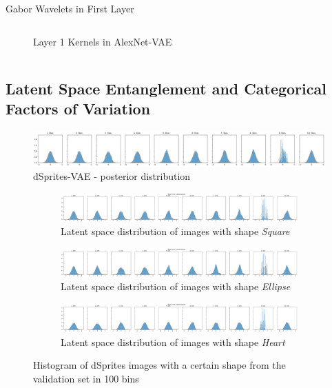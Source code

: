 \documentclass{beamer}
\begin{document}
\begin{frame}{Gabor Wavelets in First Layer}
\begin{columns}
\begin{column}{0.48\textwidth}
\begin{figure}
\caption{Layer 1 Kernels in AlexNet-VAE}
\end{figure}
\end{column}
\end{columns}
\end{frame}
\subsection{Latent Space Entanglement and Categorical Factors of Variation}
\begin{frame}
\begin{figure}
\centering
\includegraphics[width=\textwidth]{images/latent_space_entanglement/vae_dsprites_lf_10000_dist.png}
\caption[VAE Latent Space Distribution - dSprites]{dSprites-VAE - posterior distribution}
\end{figure}
\end{frame}
\begin{frame}
\begin{figure}
\centering
\begin{subfigure}{\textwidth}
\centering
\includegraphics[width=\textwidth]{images/latent_space_entanglement/vae_dsprites_lf_10000_dist_shape_1.png}
\caption{Latent space distribution of images with shape \textit{Square}}
\end{subfigure}
\begin{subfigure}{\textwidth}
\centering
\includegraphics[width=\textwidth]{images/latent_space_entanglement/vae_dsprites_lf_10000_dist_shape_2.png}
\caption{Latent space distribution of images with shape \textit{Ellipse}}
\end{subfigure}
\begin{subfigure}{\textwidth}
\centering
\includegraphics[width=\textwidth]{images/latent_space_entanglement/vae_dsprites_lf_10000_dist_shape_3.png}
\caption{Latent space distribution of images with shape \textit{Heart}}
\end{subfigure}
\caption[VAE Latent Space Distribution - dSprites Shapes]{Histogram of dSprites images with a certain shape from the validation set in 100 bins}
\end{figure}
\end{frame}
\end{document}

